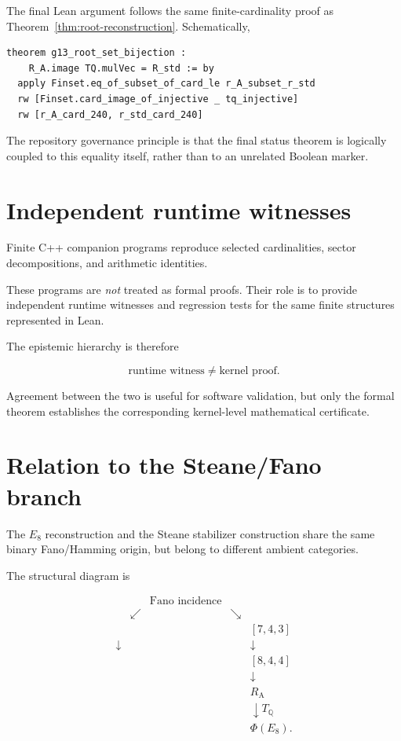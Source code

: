 \documentclass[11pt,a4paper]{article}
\theoremstyle{definition}
\theoremstyle{remark}
\newcommand{\RA}{R_{\mathrm A}}
\newcommand{\TQ}{T_{\mathbb Q}}
\begin{document}
The final Lean argument follows the same finite-cardinality proof as
Theorem~\ref{thm:root-reconstruction}.  Schematically,

\begin{verbatim}
theorem g13_root_set_bijection :
    R_A.image TQ.mulVec = R_std := by
  apply Finset.eq_of_subset_of_card_le r_A_subset_r_std
  rw [Finset.card_image_of_injective _ tq_injective]
  rw [r_A_card_240, r_std_card_240]
\end{verbatim}

The repository governance principle is that the final status theorem is
logically coupled to this equality itself, rather than to an unrelated
Boolean marker.

\section{Independent runtime witnesses}

Finite C++ companion programs reproduce selected cardinalities, sector
decompositions, and arithmetic identities.

These programs are \emph{not} treated as formal proofs.  Their role is to
provide independent runtime witnesses and regression tests for the same
finite structures represented in Lean.

The epistemic hierarchy is therefore

\[
\boxed{
\text{runtime witness}
\neq
\text{kernel proof}.
}
\]

Agreement between the two is useful for software validation, but only the
formal theorem establishes the corresponding kernel-level mathematical
certificate.

\section{Relation to the Steane/Fano branch}

The $E_8$ reconstruction and the Steane stabilizer construction share the
same binary Fano/Hamming origin, but belong to different ambient categories.

The structural diagram is

\[
\begin{array}{ccccc}
&&\text{Fano incidence}&&\\[1mm]
&\swarrow&&\searrow&\\
[7,3,4]&&&&[7,4,3]\\
\downarrow&&&&\downarrow\\
[[7,1,3]]&&&&[8,4,4]\\
&&&&\downarrow\\
&&&&\RA\\
&&&&\downarrow\TQ\\
&&&&\Phi(E_8).
\end{array}
\]
\end{document}
